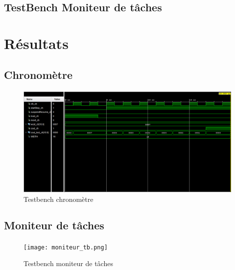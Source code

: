 \documentclass[a4paper,12pt]{report}
\begin{document}
		\subsection{TestBench Moniteur de tâches}
			\paragraph*{}
			
			
	\section{Résultats}
		\subsection{Chronomètre}
			\paragraph*{}
			
			\begin{figure}[H]
				\centering
					\includegraphics[scale=0.5]{chrono_tb.png}
					\caption{Testbench chronomètre}
				\label{chronoTB}
			\end{figure}
			
		\subsection{Moniteur de tâches}
			\paragraph*{}
	
			\begin{figure}[H]
				\centering
					\texttt{[image: moniteur\_tb.png]}
					\caption{Testbench moniteur de tâches}
				\label{monitorTB}
			\end{figure}
	
\end{document}
